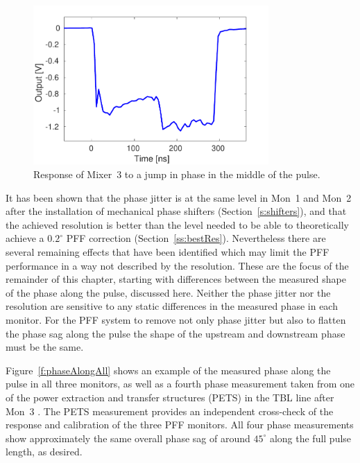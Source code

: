 \begin{figure}
  \centering
  \includegraphics[width=0.8\textwidth]{Figures/phaseMons/bandwidthPlot}
  \caption{Response of Mixer~3 to a jump in phase in the middle of the pulse.}
  \label{f:bandwidthPlot}
\end{figure}

%



It has been shown that the phase jitter is at the same level in Mon~1 and Mon~2 after the installation of mechanical phase shifters (Section~\ref{s:shifters}), and that the achieved resolution is better than the level needed to be able to theoretically achieve a \(0.2^\circ\) PFF correction (Section~\ref{ss:bestRes}). Nevertheless there are several remaining effects that have been identified which may limit the PFF performance in a way not described by the resolution. These are the focus of the remainder of this chapter, starting with differences between the measured shape of the phase along the pulse, discussed here. Neither the phase jitter nor the resolution are sensitive to any static differences in the measured phase in each monitor. For the PFF system to remove not only phase jitter but also to flatten the phase sag along the pulse the shape of the upstream and downstream phase must be the same.

Figure~\ref{f:phaseAlongAll} shows an example of the measured phase along the pulse in all three monitors, as well as a fourth phase measurement taken from one of the power extraction and transfer structures (PETS) in the TBL line after Mon~3 \cite{reidarPETS}. The PETS measurement provides an independent cross-check of the response and calibration of the three PFF monitors. All four phase measurements show approximately the same overall phase sag of around \(45^\circ\) along the full pulse length, as desired.

